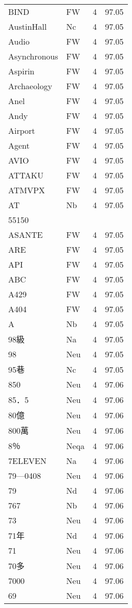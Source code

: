 \documentclass[twocolumn]{book}
\begin{document}
\begin{supertabular}{llrr}
BIND & FW & 4 &  97.05\\
AustinHall & Nc & 4 &  97.05\\
Audio & FW & 4 &  97.05\\
Asynchronous & FW & 4 &  97.05\\
Aspirin & FW & 4 &  97.05\\
Archaeology & FW & 4 &  97.05\\
Anel & FW & 4 &  97.05\\
Andy & FW & 4 &  97.05\\
Airport & FW & 4 &  97.05\\
Agent & FW & 4 &  97.05\\
AVIO & FW & 4 &  97.05\\
ATTAKU & FW & 4 &  97.05\\
ATMVPX & FW & 4 &  97.05\\
AT & Nb & 4 &  97.05\\
55150\\
ASANTE & FW & 4 &  97.05\\
ARE & FW & 4 &  97.05\\
API & FW & 4 &  97.05\\
ABC & FW & 4 &  97.05\\
A429 & FW & 4 &  97.05\\
A404 & FW & 4 &  97.05\\
A & Nb & 4 &  97.05\\
98級 & Na & 4 &  97.05\\
98 & Neu & 4 &  97.05\\
95巷 & Nc & 4 &  97.05\\
850 & Neu & 4 &  97.06\\
85．5 & Neu & 4 &  97.06\\
80億 & Neu & 4 &  97.06\\
800萬 & Neu & 4 &  97.06\\
8％ & Neqa & 4 &  97.06\\
7ELEVEN & Na & 4 &  97.06\\
79—0408 & Neu & 4 &  97.06\\
79 & Nd & 4 &  97.06\\
767 & Nb & 4 &  97.06\\
73 & Neu & 4 &  97.06\\
71年 & Nd & 4 &  97.06\\
71 & Neu & 4 &  97.06\\
70多 & Neu & 4 &  97.06\\
7000 & Neu & 4 &  97.06\\
69 & Neu & 4 &  97.06\\

\end{supertabular}
\end{document}
